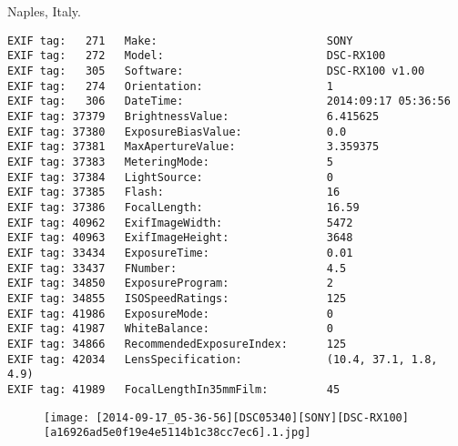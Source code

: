 \section{\protect{}}
\noindent Naples, Italy.
\noindent
\begin{lstlisting}
EXIF tag:   271   Make:                          SONY
EXIF tag:   272   Model:                         DSC-RX100
EXIF tag:   305   Software:                      DSC-RX100 v1.00
EXIF tag:   274   Orientation:                   1
EXIF tag:   306   DateTime:                      2014:09:17 05:36:56
EXIF tag: 37379   BrightnessValue:               6.415625
EXIF tag: 37380   ExposureBiasValue:             0.0
EXIF tag: 37381   MaxApertureValue:              3.359375
EXIF tag: 37383   MeteringMode:                  5
EXIF tag: 37384   LightSource:                   0
EXIF tag: 37385   Flash:                         16
EXIF tag: 37386   FocalLength:                   16.59
EXIF tag: 40962   ExifImageWidth:                5472
EXIF tag: 40963   ExifImageHeight:               3648
EXIF tag: 33434   ExposureTime:                  0.01
EXIF tag: 33437   FNumber:                       4.5
EXIF tag: 34850   ExposureProgram:               2
EXIF tag: 34855   ISOSpeedRatings:               125
EXIF tag: 41986   ExposureMode:                  0
EXIF tag: 41987   WhiteBalance:                  0
EXIF tag: 34866   RecommendedExposureIndex:      125
EXIF tag: 42034   LensSpecification:             (10.4, 37.1, 1.8, 4.9)
EXIF tag: 41989   FocalLengthIn35mmFilm:         45

\end{lstlisting}
\clearpage
\begin{figure}
\raggedleft
\texttt{[image: [2014-09-17\_05-36-56][DSC05340][SONY][DSC-RX100][a16926ad5e0f19e4e5114b1c38cc7ec6].1.jpg]}
\end{figure}


\clearpage
